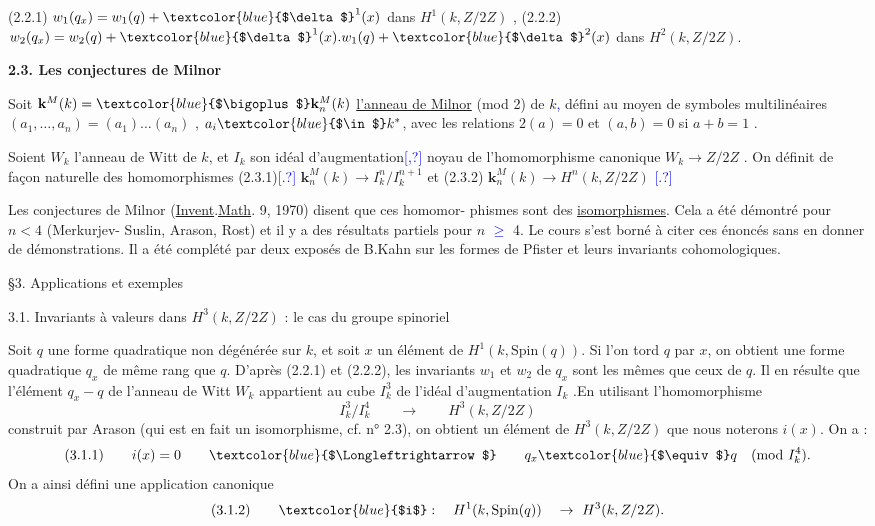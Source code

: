 \documentclass[11pt]{article}
\newcommand{\scanpage}[1]{\par\bigskip\noindent{\small\sffamily[scan #1]}\par}
\newcommand{\mspage}[1]{{\small\sffamily[p.\,#1]}}
\newcommand{\hand}[1]{\textcolor{blue}{#1}}
\newcommand{\uline}[1]{\underline{#1}}
\newcommand{\unsure}[1]{[#1?]}
\begin{document}
(2.2.1) \quad $w_1(q_x) = w_1(q) + \hand{$\delta$}^1(x)$ \qquad dans $H^1(k,Z/2Z)$ ,
(2.2.2) \quad $w_2(q_x) = w_2(q) + \hand{$\delta$}^1(x).w_1(q) + \hand{$\delta$}^2(x)$ \quad dans $H^2(k, Z/2Z)$.

\textbf{2.3. Les conjectures de Milnor}

Soit $\mathbf{k}^M(k) = \hand{$\bigoplus$} \mathbf{k}^M_n(k)$ \uline{l'anneau de Milnor} (mod 2) de $k$\hand{,} défini au
moyen de symboles multilinéaires $(a_1,\dots,a_n) = (a_1)\dots(a_n)$ , $a_i \hand{$\in$} k^*$, avec
les relations $2(a) = 0$ et $(a,b) = 0$ si $a+b = 1$ .

Soient $W_k$ l'anneau de Witt de $k$, et $I_k$ son idéal d'augmentation\hand{\unsure{,}} noyau de
l'homomorphisme canonique $W_k \to Z/2Z$ .
On définit de façon naturelle des homomorphismes
(2.3.1)\hand{\unsure{.}} \quad $\mathbf{k}^M_n(k) \to I^n_k/I^{n+1}_k$
et
(2.3.2) \quad $\mathbf{k}^M_n(k) \to H^n(k,Z/2Z)$ \hand{\unsure{.}}

\mspage{\hand{290}}

\clearpage
\scanpage{119/291}
\mspage{4}

Les conjectures de Milnor (\uline{Invent}.\uline{Math}. 9, 1970) disent que ces homomor-%
phismes sont des \uline{isomorphismes}. Cela a été démontré pour $n < 4$ (Merkurjev-%
Suslin, Arason, Rost) et il y a des résultats partiels pour $n$ \hand{$\geqslant$} 4.
Le cours s'est borné à citer ces énoncés sans en donner de démonstrations.
Il a été complété par deux exposés de B.Kahn sur les formes de Pfister
et leurs invariants cohomologiques.

§3. Applications et exemples

3.1. Invariants à valeurs dans $H^3(k, Z/2Z)$ : le cas du groupe spinoriel

Soit $q$ une forme quadratique non dégénérée sur $k$, et soit $x$ un
élément de $H^1(k, \mathrm{Spin}(q))$. Si l'on tord $q$ par $x$, on obtient une forme
quadratique $q_x$ de même rang que $q$. D'après (2.2.1) et (2.2.2), les
invariants $w_1$ et $w_2$ de $q_x$ sont les mêmes que ceux de $q$. Il en résulte que
l'élément $q_x - q$ de l'anneau de Witt $W_k$ appartient au cube $I_k^3$ de
l'idéal d'augmentation $I_k$ .En utilisant l'homomorphisme
\[ I_k^3/I_k^4 \qquad \to \qquad H^3(k, Z/2Z) \]
construit par Arason (qui est en fait un isomorphisme, cf. n° 2.3), on
obtient un élément de $H^3(k, Z/2Z)$ que nous noterons $i(x)$. On a :
\[ (3.1.1) \qquad i(x) = 0 \qquad \hand{$\Longleftrightarrow$} \qquad q_x \hand{$\equiv$} q \quad (\mathrm{mod}\ I_k^4). \]
On a ainsi défini une application canonique
\[ (3.1.2) \qquad \hand{$i$} : \quad H^1(k, \mathrm{Spin}(q)) \quad \to \ H^3(k, Z/2Z). \]
\end{document}
